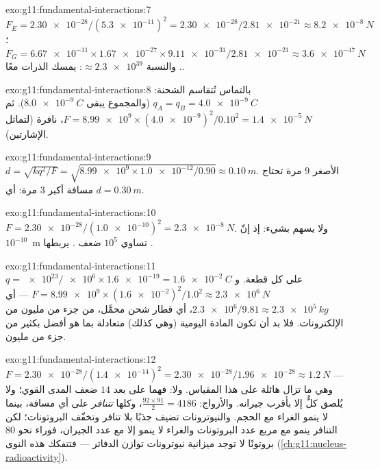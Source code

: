\begin{solution}{exo:g11:fundamental-interactions:7}
$F_E = \num{2.30e-28}/(\num{5.3e-11})^2 = \num{2.30e-28}/\num{2.81e-21}
\approx \qty{8.2e-8}{N}$؛
$F_G = \num{6.67e-11} \times \num{1.67e-27} \times \num{9.11e-31} /
\num{2.81e-21} \approx \qty{3.6e-47}{N}$. والنسبة $\approx \num{2.3e39}$:
 يمسك الذرات معًا.
\end{solution}

\begin{solution}{exo:g11:fundamental-interactions:8}
بالتماس تُتقاسم الشحنة: $q_A = q_B = \qty{+4.0e-9}{C}$ (والمجموع
يبقى $\qty{8.0e-9}{C}$). ثم
$F = \num{8.99e9} \times (\num{4.0e-9})^2/0.10^2 =
\qty{1.4e-5}{N}$، نافرة (لتماثل الإشارتين).
\end{solution}

\begin{solution}{exo:g11:fundamental-interactions:9}
$d = \sqrt{k q^2/F} = \sqrt{\num{8.99e9} \times \num{1.0e-12}/0.90}
\approx \qty{0.10}{m}$.  الأصغر $9$ مرة تحتاج مسافة أكبر $3$
مرة: أي $d = \qty{0.30}{m}$.
\end{solution}

\begin{solution}{exo:g11:fundamental-interactions:10}
$F = \num{2.30e-28}/(\num{1.0e-10})^2 = \qty{2.3e-8}{N}$. ولا يسهم  بشيء: إذ إنّ $10^{-10}$~m تساوي $10^{5}$ ضعف
.  يربطها .
\end{solution}

\begin{solution}{exo:g11:fundamental-interactions:11}
$q = \num{e23}/\num{e6} \times \num{1.6e-19} = \qty{1.6e-2}{C}$ على كل
قطعة. و$F = \num{8.99e9} \times (\num{1.6e-2})^2/1.0^2 \approx
\qty{2.3e6}{N}$ --- أي  $\num{2.3e6}/9.81 \approx
\qty{2.3e5}{kg}$، أي قطار شحن محمَّل، من جزء من مليون من
الإلكترونات. فلا بد أن تكون المادة اليومية (وهي كذلك) متعادلة بما هو أفضل بكثير من
جزء من مليون.
\end{solution}

\begin{solution}{exo:g11:fundamental-interactions:12}
$F = \num{2.30e-28}/(\num{1.4e-14})^2 = \num{2.30e-28}/\num{1.96e-28}
\approx \qty{1.2}{N}$ --- وهي ما تزال هائلة على هذا المقياس. ولا: فهما
على بعد $14$ ضعف المدى القوي؛ ولا يُلصق كلٌّ إلا بأقرب
جيرانه. والأزواج: $\frac{92 \times 91}{2} = 4186$، وكلها \emph{تتنافر}
على أي مسافة، بينما لا ينمو الغراء مع الحجم.
والنيوترونات تضيف جذبًا بلا تنافر وتخفّف البروتونات؛ لكن
التنافر ينمو مع مربع عدد البروتونات والغراء لا ينمو إلا مع
عدد الجيران، فوراء نحو $80$ بروتونًا لا توجد ميزانية نيوترونات
توازن الدفاتر --- فتتفكك هذه النوى
(\cref{ch:g11:nucleus-radioactivity}).
\end{solution}

